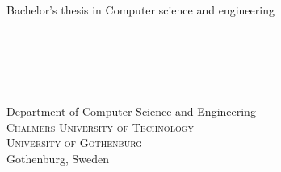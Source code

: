 
\begin{titlepage}
			
\addtolength{\voffset}{2cm}

\begin{figure}[H]
    \centering
    \vspace{1cm}
\end{figure}

\mbox{}
\vfill

\renewcommand{\familydefault}{\sfdefault} \normalfont 

\textbf{\Huge \multiLineTitle{0.2cm}} 
\\[0.5cm]

{\Large \oneLineSubtitle}\\[0.5cm]


Bachelor's thesis in Computer science and engineering \setlength{\parskip}{1cm}

{\Large \MARTIN} \setlength{\parskip}{2.9cm}\\[1ex]
{\Large \FELIX} \setlength{\parskip}{2.9cm}\\[1ex]
{\Large \HANNES} \setlength{\parskip}{2.9cm}\\[1ex]
{\Large \MARCUS} \setlength{\parskip}{2.9cm}\\[1ex]
{\Large \JAKOB} \setlength{\parskip}{2.9cm}

Department of Computer Science and Engineering \\
\textsc{Chalmers University of Technology} \\
\textsc{University of Gothenburg} \\
Gothenburg, Sweden \the\year

\renewcommand{\familydefault}{\rmdefault} \normalfont %
\end{titlepage}


